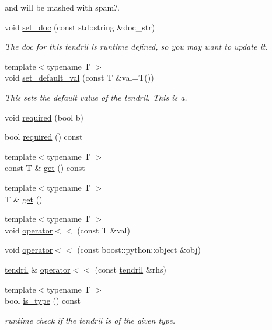\begin{DoxyCompactItemize}
\begin{DoxyCompactList}
and will be mashed with spam.\char`\"{}. \end{DoxyCompactList}\item 
void \hyperlink{classecto_1_1tendril_ad56ae7364e7f7464eba444aebc50adc8}{set\+\_\+doc} (const std\+::string \&doc\+\_\+str)
\begin{DoxyCompactList}\small\item\em The doc for this tendril is runtime defined, so you may want to update it. \end{DoxyCompactList}\item 
{\footnotesize template$<$typename T $>$ }\\void \hyperlink{classecto_1_1tendril_a9186713043e34915df9488fb135110b3}{set\+\_\+default\+\_\+val} (const T \&val=T())
\begin{DoxyCompactList}\small\item\em This sets the default value of the tendril. This is a. \end{DoxyCompactList}\item 
void \hyperlink{classecto_1_1tendril_a216eb6b817644e1dfd76d3ba07d0ced7}{required} (bool b)
\item 
bool \hyperlink{classecto_1_1tendril_aa10be79605183977989cf01956aedeb6}{required} () const 
\item 
{\footnotesize template$<$typename T $>$ }\\const T \& \hyperlink{classecto_1_1tendril_aeeacd721a1d85f6c71c6d238b47c17f6}{get} () const 
\item 
{\footnotesize template$<$typename T $>$ }\\T \& \hyperlink{classecto_1_1tendril_a25420b71b89431659b310730ca6c55f0}{get} ()
\item 
{\footnotesize template$<$typename T $>$ }\\void \hyperlink{classecto_1_1tendril_ab02075b0d910360104974c1771edcc7f}{operator$<$$<$} (const T \&val)
\item 
void \hyperlink{classecto_1_1tendril_af9df4c4225712b440c9340d8969e337e}{operator$<$$<$} (const boost\+::python\+::object \&obj)
\item 
\hyperlink{classecto_1_1tendril}{tendril} \& \hyperlink{classecto_1_1tendril_adbf8a7e6ac9bc41d9a17f2f362e8d3f6}{operator$<$$<$} (const \hyperlink{classecto_1_1tendril}{tendril} \&rhs)
\item 
{\footnotesize template$<$typename T $>$ }\\bool \hyperlink{classecto_1_1tendril_adec0a36989492e2bd9ae9f03f954b9af}{is\+\_\+type} () const 
\begin{DoxyCompactList}\small\item\em runtime check if the tendril is of the given type. \end{DoxyCompactList}\item 

\end{DoxyCompactItemize}
